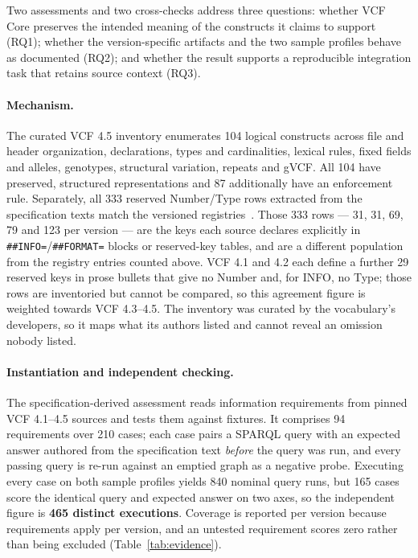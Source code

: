 \documentclass{ceurart}
\begin{document}
Two assessments and two cross-checks address three questions: whether VCF Core preserves the intended meaning of the constructs it claims to support (RQ1); whether the version-specific artifacts and the two sample profiles behave as documented (RQ2); and whether the result supports a reproducible integration task that retains source context (RQ3).

\paragraph{Mechanism.}
The curated VCF 4.5 inventory enumerates 104 logical constructs across file and header organization, declarations, types and cardinalities, lexical rules, fixed fields and alleles, genotypes, structural variation, repeats and gVCF. 
All 104 have preserved, structured representations and 87 additionally have an enforcement rule. 
Separately, all 333 reserved Number/Type rows extracted from the specification texts match the versioned registries~\cite{vcfc210}. 
Those 333 rows --- 31, 31, 69, 79 and 123 per version --- are the keys each source declares explicitly in \texttt{\#\#INFO=}/\texttt{\#\#FORMAT=} blocks or reserved-key tables, and are a different population from the registry entries counted above. 
VCF 4.1 and 4.2 each define a further 29 reserved keys in prose bullets that give no Number and, for INFO, no Type; those rows are inventoried but cannot be compared, so this agreement figure is weighted towards VCF 4.3--4.5. 
The inventory was curated by the vocabulary's developers, so it maps what its authors listed and cannot reveal an omission nobody listed.

\paragraph{Instantiation and independent checking.}
The specification-derived assessment reads information requirements from pinned VCF 4.1--4.5 sources and tests them against fixtures. 
It comprises 94 requirements over 210 cases; each case pairs a SPARQL query with an expected answer authored from the specification text \emph{before} the query was run, and every passing query is re-run against an emptied graph as a negative probe. 
Executing every case on both sample profiles yields 840 nominal query runs, but 165 cases score the identical query and expected answer on two axes, so the independent figure is \textbf{465 distinct executions}. 
Coverage is reported per version because requirements apply per version, and an untested requirement scores zero rather than being excluded (Table~\ref{tab:evidence}).
\end{document}
